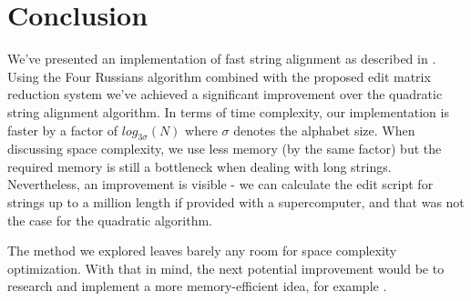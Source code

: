 \documentclass[times, utf8, seminar, numeric]{fer}
\begin{document}
\chapter{Conclusion}
We've presented an implementation of fast string alignment as described in \cite{masek1980faster}. Using the Four Russians algorithm combined with the proposed edit matrix reduction system we've achieved a significant improvement over the quadratic string alignment algorithm. In terms of time complexity, our implementation is faster by a factor of $log_{3\sigma}(N)$ where $\sigma$ denotes the alphabet size. When discussing space complexity, we use less memory (by the same factor) but the required memory is still a bottleneck when dealing with long strings. Nevertheless, an improvement is visible - we can calculate the edit script for strings up to a million length if provided with a supercomputer, and that was not the case for the quadratic algorithm.

The method we explored leaves barely any room for space complexity optimization. With that in mind, the next potential improvement would be to research and implement a more memory-efficient idea, for example \cite{kundeti2008extending}.




\nocite{*}
\end{document}
